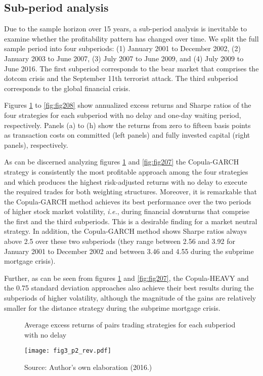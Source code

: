 \documentclass[a4paper,12pt]{report}
\begin{document}
\begin{refsection}
\vspace{1.0cm}

\subsection{Sub-period analysis}

Due to the sample horizon over 15 years, a sub-period analysis is inevitable to examine whether the profitability pattern has changed over time. We split the full sample period into four subperiods: (1) January 2001 to December 2002, (2) January 2003 to June 2007, (3) July 2007 to June 2009, and (4) July 2009 to June 2016. The first subperiod corresponds to the bear market that comprises the dotcom crisis and the September 11th terrorist attack. The third subperiod corresponds to the global financial crisis.

Figures \ref{fig:fig205} to \ref{fig:fig208} show annualized excess returns and Sharpe ratios of the four strategies for each subperiod with no delay and one-day waiting period, respectively. Panels (a) to (h) show the returns from zero to fifteen basis points as transaction costs on committed (left panels) and fully invested capital (right panels), respectively. 

As can be discerned analyzing figures \ref{fig:fig205} and \ref{fig:fig207} the Copula-GARCH strategy is consistently the most profitable approach among the four strategies and which produces the highest risk-adjusted returns with no delay to execute the required trades for both weighting structures. Moreover, it is remarkable that the Copula-GARCH method achieves its best performance over the two periods of higher stock market volatility, \emph{i.e.}, during financial downturns that comprise the first and the third subperiods. This is a desirable finding for a market neutral strategy. In addition, the Copula-GARCH method shows Sharpe ratios always above 2.5 over these two subperiods (they range between 2.56 and 3.92 for January 2001 to December 2002 and between 3.46 and 4.55 during the subprime mortgage crisis).

Further, as can be seen from figures \ref{fig:fig205} and \ref{fig:fig207}, the Copula-HEAVY and the 0.75 standard deviation approaches also achieve their best results during the subperiods of higher volatility, although the magnitude of the gains are relatively smaller for the distance strategy during the subprime mortgage crisis. 

\begin{figure}[H]
	\centering
	\caption{Average excess returns of pairs trading strategies for each subperiod with no delay}
	\texttt{[image: fig3\_p2\_rev.pdf]}
	\captionsetup{justification=raggedright,
		singlelinecheck=false
	}
	\caption*{Source: Author's own elaboration (2016.)}
	\label{fig:fig205}
\end{figure}


\end{refsection}
\end{document}
